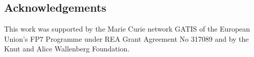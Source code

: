 \subsection*{Acknowledgements}
This work was supported by the Marie Curie network GATIS of the European Union's FP7 Programme under REA Grant Agreement No 317089 and by the Knut and Alice Wallenberg Foundation.
